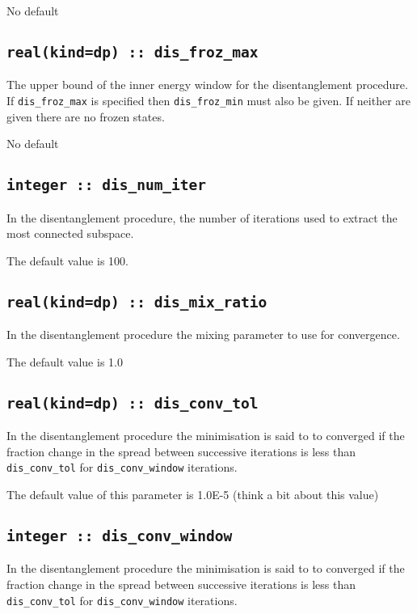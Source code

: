 No default

\subsection[dis\_froz\_max]{\tt real(kind=dp) :: dis\_froz\_max}
The upper bound of the inner energy window for the disentanglement
procedure. If \verb#dis_froz_max# is specified then \verb#dis_froz_min#
must also be given. If neither are given there are no frozen states.

No default

\subsection[dis\_num\_iter]{\tt integer :: dis\_num\_iter}
In the disentanglement procedure, the
number of iterations used to extract the most connected subspace.

The default value is 100.

\subsection[dis\_mix\_ratio]{\tt real(kind=dp) :: dis\_mix\_ratio}
In the disentanglement procedure the mixing parameter to use for
convergence.

The default value is 1.0

\subsection[dis\_conv\_tol]{\tt real(kind=dp) :: dis\_conv\_tol}

In the disentanglement procedure the minimisation is said to to converged
if the fraction change in the spread between successive
iterations is less than
\verb#dis_conv_tol# for \verb#dis_conv_window# iterations.

The default value of this parameter is 1.0E-5 (think a bit about this value)


\subsection[dis\_conv\_window]{\tt integer :: dis\_conv\_window}

In the disentanglement procedure the minimisation is said to to converged
if the fraction change in the spread between successive
iterations is less than
\verb#dis_conv_tol# for \verb#dis_conv_window# iterations.

